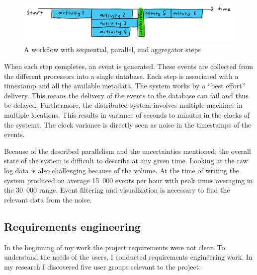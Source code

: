 \begin{figure}[htb]
\centering \includegraphics[width=0.9\linewidth]{gfx/figures/workflow.png}
\caption{A workflow with sequential, parallel, and aggregator steps}
\label{fig:workflowexample}
\end{figure}

When each step completes, an event is generated.
These events are collected from the different processors into a single database.
Each step is associated with a timestamp and all the available metadata.
The system works by a ``best effort'' delivery. 
This means the delivery of the events to the database can fail and thus be delayed.
Furthermore, the distributed system involves multiple machines in multiple locations. 
This results in variance of seconds to minutes in the clocks of the systems.
The clock variance is directly seen as noise in the timestamps of the events.

Because of the described parallelism and the uncertainties mentioned, the overall state of the system is difficult to describe at any given time.
Looking at the raw log data is also challenging because of the volume.
At the time of writing the system produced on average 15~000 events per hour with peak times averaging in the 30~000 range.
Event filtering and visualization is necessary to find the relevant data from the noise.

\subsection{Requirements engineering}

In the beginning of my work the project requirements were not clear.
To understand the needs of the users, I conducted requirements engineering work.
In my research I discovered five user groups  relevant to the project:


